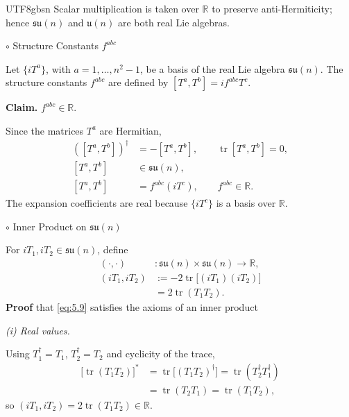 \documentclass[11pt,a4paper,oneside]{report}
\makeatletter
\newcommand\divtitle[1]{\par\addvspace{1.1ex}\noindent
  {\normalfont\normalsize #1}\par\nobreak\vspace{.35ex}\@afterindentfalse\@afterheading}
\newenvironment{qftinset}{\begin{list}{}{\setlength{\leftmargin}{2em}\setlength{\rightmargin}{0pt}\setlength{\listparindent}{\parindent}}\item[]}{\end{list}}
\makeatother
\begin{document}
\begin{CJK*}{UTF8}{gbsn}
Scalar multiplication is taken over $\mathbb R$ to preserve anti-Hermiticity; hence $\mathfrak{su}(n)$ and  $\mathfrak{u}(n)$ are both real Lie algebras.

\label{ym-4}%
\begin{qftinset}

\divtitle{$\circ$ Structure Constants $f^{abc}$}

Let $\{iT^a\}$, with $a=1,\ldots,n^2-1$, be a basis of the real Lie algebra $\mathfrak{su}(n)$.
The structure constants $f^{abc}$ are defined by $[T^a,T^b]=if^{abc}T^c$.

\textbf{\boldmath Claim.} $f^{abc}\in\mathbb R$.

Since the matrices $T^a$ are Hermitian,
\begin{equation*}
\begin{aligned}
([T^a,T^b])^\dagger&=-[T^a,T^b],\qquad
\operatorname{tr}[T^a,T^b]=0,\\[6pt]
[T^a,T^b]&\in\mathfrak{su}(n),\\[6pt]
[T^a,T^b]&=f^{abc}(iT^c),\qquad f^{abc}\in\mathbb R.
\end{aligned}
\tag{5.8}\label{eq:5.8}
\end{equation*}
The expansion coefficients are real because $\{iT^c\}$ is a basis over $\mathbb R$.

\end{qftinset}

\begin{qftinset}

\divtitle{$\circ$ Inner Product on $\mathfrak{su}(n)$}

For $iT_1,iT_2\in\mathfrak{su}(n)$, define
\begin{equation*}
\begin{aligned}
(\cdot,\cdot)&:\mathfrak{su}(n)\times\mathfrak{su}(n)\longrightarrow\mathbb R,\\[6pt]
(iT_1,iT_2)&:=-2\operatorname{tr}\bigl[(iT_1)(iT_2)\bigr]\\
&=2\operatorname{tr}(T_1T_2).
\end{aligned}
\tag{5.9}\label{eq:5.9}
\end{equation*}
\textbf{\boldmath Proof} that \eqref{eq:5.9} satisfies the axioms of an inner product

\emph{(i) Real values.}

Using $T_1^\dagger=T_1$, $T_2^\dagger=T_2$ and cyclicity of the trace,
\begin{equation*}
\begin{aligned}
\bigl[\operatorname{tr}(T_1T_2)\bigr]^*
&=\operatorname{tr}\bigl[(T_1T_2)^\dagger\bigr]
=\operatorname{tr}(T_2^\dagger T_1^\dagger)\\
&=\operatorname{tr}(T_2T_1)
=\operatorname{tr}(T_1T_2),
\end{aligned}
\tag{5.10}\label{eq:5.10}
\end{equation*}
so $(iT_1,iT_2)=2\operatorname{tr}(T_1T_2)\in\mathbb R$.


\end{qftinset}
\end{CJK*}
\end{document}
